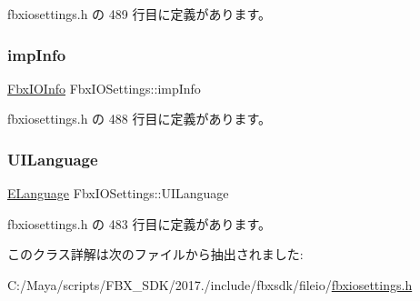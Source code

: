  fbxiosettings.\+h の 489 行目に定義があります。

\mbox{\label{class_fbx_i_o_settings_aa966915ec88f2963202d309e43b12e34}} 
\subsubsection{\texorpdfstring{imp\+Info}{impInfo}}
{\footnotesize\ttfamily \hyperlink{class_fbx_i_o_info}{Fbx\+I\+O\+Info} Fbx\+I\+O\+Settings\+::imp\+Info}



 fbxiosettings.\+h の 488 行目に定義があります。

\mbox{\label{class_fbx_i_o_settings_a66b062ff1bbcedce5978358a81ec9026}} 
\subsubsection{\texorpdfstring{U\+I\+Language}{UILanguage}}
{\footnotesize\ttfamily \hyperlink{class_fbx_i_o_settings_a84f2effd8e41c382faa5ca58046f323f}{E\+Language} Fbx\+I\+O\+Settings\+::\+U\+I\+Language}



 fbxiosettings.\+h の 483 行目に定義があります。



このクラス詳解は次のファイルから抽出されました\+:\begin{DoxyCompactItemize}
\item 
C\+:/\+Maya/scripts/\+F\+B\+X\+\_\+\+S\+D\+K/2017./include/fbxsdk/fileio/\hyperlink{fbxiosettings_8h}{fbxiosettings.\+h}\end{DoxyCompactItemize}
